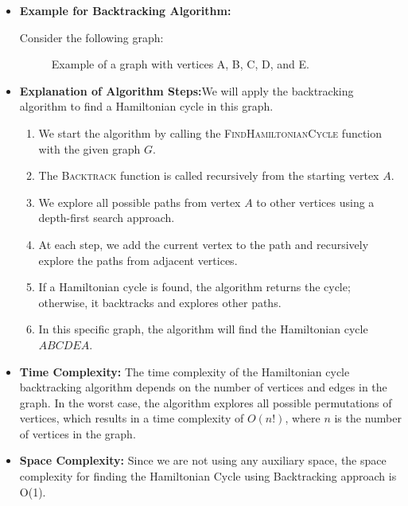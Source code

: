 \documentclass[14pt, times, a4paper]{extarticle}
\begin{document}
\begin{itemize}
    \item {\textbf{Example for Backtracking Algorithm:}

Consider the following graph:

\begin{figure}[h]
  \centering
  \caption{Example of a graph with vertices A, B, C, D, and E.}
\end{figure}}
\item {\textbf{Explanation of Algorithm Steps:}We will apply the backtracking algorithm to find a Hamiltonian cycle in this graph.

\begin{enumerate}
    \item We start the algorithm by calling the \textsc{FindHamiltonianCycle} function with the given graph $G$.
    \item The \textsc{Backtrack} function is called recursively from the starting vertex $A$.
    \item We explore all possible paths from vertex $A$ to other vertices using a depth-first search approach.
    \item At each step, we add the current vertex to the path and recursively explore the paths from adjacent vertices.
    \item If a Hamiltonian cycle is found, the algorithm returns the cycle; otherwise, it backtracks and explores other paths.
    \item In this specific graph, the algorithm will find the Hamiltonian cycle $ABCDEA$.
\end{enumerate}}
\end{itemize}
\begin{itemize}
    \item {\textbf{Time Complexity:}}
The time complexity of the Hamiltonian cycle backtracking algorithm depends on the number of vertices and edges in the graph. In the worst case, the algorithm explores all possible permutations of vertices, which results in a time complexity of $O(n!)$, where $n$ is the number of vertices in the graph.
\item {\textbf{Space Complexity:}}
Since we are not using any auxiliary space, the space complexity for finding the Hamiltonian Cycle using Backtracking approach is O(1).
\end{itemize}
\end{document}
